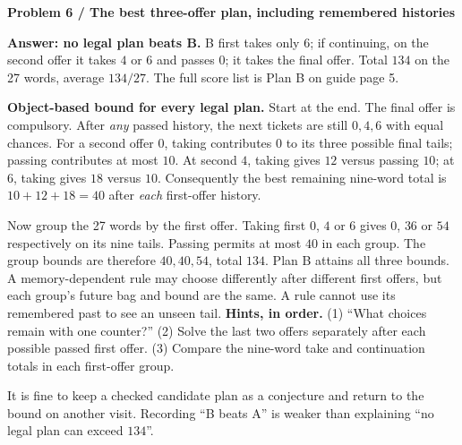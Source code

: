\documentclass[11pt,letterpaper]{article}
\newcommand{\task}[2]{\par\textbf{Problem #1 / #2}\par}
\newcommand{\hint}[1]{\textbf{Hints, in order.} #1\par}
\begin{document}
\task{6}{The best three-offer plan, including remembered histories}
\textbf{Answer: no legal plan beats B.} B first takes only $6$; if continuing,
on the second offer it takes $4$ or $6$ and passes $0$; it takes the final offer. Total $134$ on the 27 words,
average $134/27$. The full score list is Plan B on guide page 5.

\textbf{Object-based bound for every legal plan.} Start at the end. The final
offer is compulsory. After \emph{any} passed history, the next tickets are still
$0,4,6$ with equal chances. For a second offer $0$, taking contributes $0$ to
its three possible final tails; passing contributes at most $10$. At second
$4$, taking gives $12$ versus passing $10$; at $6$, taking gives $18$ versus
$10$. Consequently the best remaining nine-word total is $10+12+18=40$
after \emph{each} first-offer history.

Now group the 27 words by the first offer. Taking first $0$, $4$ or $6$ gives
$0$, $36$ or $54$ respectively on its nine tails. Passing permits at most
$40$ in each group. The group bounds are therefore $40,40,54$, total $134$.
Plan B attains all three bounds. A memory-dependent rule may choose differently
after different first offers, but each group's future bag and bound are the
same. A rule cannot use its remembered past to see an unseen tail.
\hint{(1) ``What choices remain with one counter?''
(2) Solve the last two offers separately after each possible passed first offer.
(3) Compare the nine-word take and continuation totals in each first-offer group.}
It is fine to keep a checked candidate plan as a conjecture and return to the
bound on another visit. Recording ``B beats A'' is weaker than explaining
``no legal plan can exceed $134$''.
\end{document}
